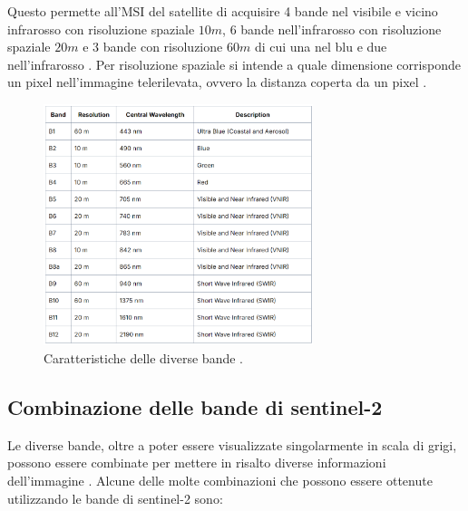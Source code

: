Questo permette all'MSI del satellite di acquisire 4 bande nel visibile e 
vicino infrarosso con risoluzione spaziale $10m$, 6 bande nell'infrarosso 
con risoluzione spaziale $20m$ e 3 bande con risoluzione $60m$ di cui una nel 
blu e due nell'infrarosso \cite{MSI_SENTINEL2,ALL_ABOUT_SENTINEL2}.
Per risoluzione spaziale si intende a quale dimensione corrisponde un pixel 
nell'immagine telerilevata, ovvero la distanza coperta da un pixel \cite{ALL3_REMOTE_SENSING}.

\begin{figure}[H]
    \centering
    \includegraphics[width=0.70\textwidth]{Immagini/Generiche/Sentinel2_bands_table.png}
    \caption{Caratteristiche delle diverse bande \cite{Tabella_bande, COMBINAZIONE_BANDE_SENTINEL2} .}
    \label{fig:Tabella_bande_s2}
\end{figure}

\subsection{Combinazione delle bande di sentinel-2}
Le diverse bande, oltre a poter essere visualizzate singolarmente in scala di grigi, 
possono essere combinate per mettere in risalto diverse informazioni dell'immagine
\cite{COMBINAZIONE_BANDE_SENTINEL2, SENTINEL2_1_e_bands}.
Alcune delle molte combinazioni che possono essere ottenute utilizzando le bande di 
sentinel-2 sono:

